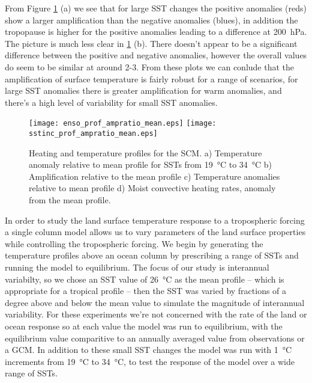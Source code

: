 From Figure \ref{fig:scmsstamp} (a) we see that for large SST changes the 
positive anomalies (reds) show a larger amplification than the negative 
anomalies (blues), in addition the tropopause is higher for the positive 
anomalies leading to a difference at \SI{200}{\hecto\pascal}. The picture is 
much less clear in \ref{fig:scmsstamp} (b). There doesn't appear to be a 
significant difference between the positive and negative anomalies, however the 
overall values do seem to be similar at around 2-3. From these plots we can 
conlude that the amplification of surface temperature is fairly robust for a 
range of scenarios, for large SST anomalies there is greater amplification for 
warm anomalies, and there's a high level of variability for small SST anomalies.

\begin{figure}[ht]
\texttt{[image: enso\_prof\_ampratio\_mean.eps]}
\texttt{[image: sstinc\_prof\_ampratio\_mean.eps]}\\
\caption{Heating and temperature profiles for the SCM. a) Temperature anomaly 
	relative to mean profile for SSTs from \SI{19}{\degreeCelsius} to 
	\SI{34}{\degreeCelsius} b) Amplification relative to the mean profile c) 
	Temperature anomalies relative to mean profile d) Moist convective heating 
rates, anomaly from the mean profile.}
\label{fig:scmsstamp}
\end{figure}

In order to study the land surface temperature response to a tropospheric 
forcing a single column model allows us to vary parameters of the land surface 
properties while controlling the tropospheric forcing.  We begin by generating 
the temperature profiles above an ocean column by prescribing a range of SSTs 
and running the model to equilibrium.  The focus of our study is interannual 
variabilty, so we chose an SST value of \SI{26}{\degreeCelsius} as the mean 
profile -- which is appropriate for a tropical profile -- then the SST was 
varied by fractions of a degree above and below the mean value to simulate the 
magnitude of interannual variability. For these experiments we're not concerned 
with the rate of the land or ocean response so at each value the model was run 
to equilibrium, with the equilibrium value comparitive to an annually averaged 
value from observations or a GCM.  In addition to these small SST changes the 
model was run with \SI{1}{\degreeCelsius} increments from 
\SI{19}{\degreeCelsius} to \SI{34}{\degreeCelsius}, to test the response of the 
model over a wide range of SSTs.

